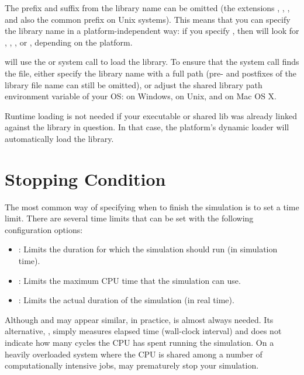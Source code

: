 The prefix and suffix from the library name can be omitted (the extensions
, , , and also the common  prefix
on Unix systems). This means that you can specify the library name in a
platform-independent way: if you specify , then {\opp} will
look for , , , or ,
depending on the platform.

{\opp} will use the  or  system call to
load the library. To ensure that the system call finds the file, either
specify the library name with a full path (pre- and postfixes of the library
file name can still be omitted), or adjust the shared library path environment
variable of your OS:  on Windows,  on Unix,
and  on Mac OS X.

\begin{note}
  Runtime loading is not needed if your executable or shared lib was
  already linked against the library in question. In that case,
  the platform's dynamic loader will automatically load the library.
\end{note}


\section{Stopping Condition}
\label{sec:run-sim:stopping-condition}

The most common way of specifying when to finish the simulation is to set a
time limit. There are several time limits that can be set with the following
configuration options:

\begin{itemize}
  \item {} : Limits the duration for which the simulation should run (in simulation time).
  \item {} : Limits the maximum CPU time that the simulation can use.
  \item {} : Limits the actual duration of the simulation (in real time).
\end{itemize}

\begin{note}
Although  and  may appear
similar, in practice,  is almost always needed. Its
alternative, , simply measures elapsed time (wall-clock
interval) and does not indicate how many cycles the CPU has spent running the
simulation. On a heavily overloaded system where the CPU is shared among a
number of computationally intensive jobs,  may
prematurely stop your simulation.
\end{note}

